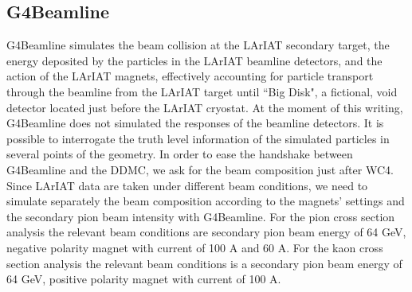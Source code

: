 \subsection{G4Beamline}\label{ch:beamlineComposition}
G4Beamline simulates the beam collision at the LArIAT secondary target, the energy deposited by the particles in the LArIAT beamline detectors, and the action of the LArIAT magnets, effectively accounting for particle transport through the beamline from the LArIAT target until ``Big Disk", a fictional, void detector located just before the LArIAT cryostat. 
 At the moment of this writing, G4Beamline does not simulated the responses of the beamline detectors. It is possible to interrogate the truth level information of the simulated particles in several points of the geometry. In order to ease the handshake between G4Beamline and the DDMC, we ask for the beam composition just after WC4.
Since LArIAT data are taken under different beam conditions, we need to simulate separately the beam composition according to the magnets' settings and the secondary pion beam intensity with G4Beamline. For the pion cross section analysis the relevant beam conditions are  secondary pion beam energy of 64 GeV, negative polarity magnet with current of 100 A and 60 A. For the kaon cross section analysis the relevant beam conditions is a secondary  pion beam energy of 64 GeV, positive polarity magnet with current of 100 A. 

